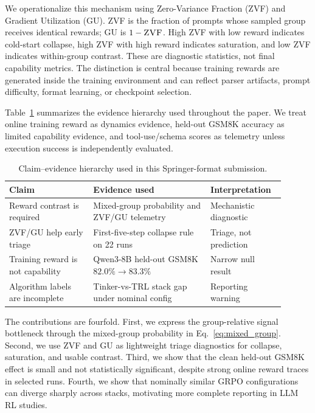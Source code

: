 \documentclass[runningheads,a4paper]{llncs}
\newcommand{\zvf}{\textsc{ZVF}}
\newcommand{\gu}{\textsc{GU}}
\begin{document}
We operationalize this mechanism using Zero-Variance Fraction (\zvf) and
Gradient Utilization (\gu). \zvf{} is the fraction of prompts whose sampled
group receives identical rewards; \gu{} is $1-\zvf$. High \zvf{} with low reward
indicates cold-start collapse, high \zvf{} with high reward indicates
saturation, and low \zvf{} indicates within-group contrast. These are diagnostic
statistics, not final capability metrics. The distinction is central because
training rewards are generated inside the training environment and can reflect
parser artifacts, prompt difficulty, format learning, or checkpoint selection.

Table~\ref{tab:claim_evidence} summarizes the evidence hierarchy used
throughout the paper. We treat online training reward as dynamics evidence,
held-out GSM8K accuracy as limited capability evidence, and tool-use/schema
scores as telemetry unless execution success is independently evaluated.

\begin{table}[t]
\centering
\caption{Claim--evidence hierarchy used in this Springer-format submission.}
\label{tab:claim_evidence}
\small
\begin{tabular}{p{0.29\linewidth}p{0.39\linewidth}p{0.22\linewidth}}
\toprule
\textbf{Claim} & \textbf{Evidence used} & \textbf{Interpretation} \\
\midrule
Reward contrast is required & Mixed-group probability and ZVF/GU telemetry & Mechanistic diagnostic \\
ZVF/GU help early triage & First-five-step collapse rule on 22 runs & Triage, not prediction \\
Training reward is not capability & Qwen3-8B held-out GSM8K $82.0\%\to83.3\%$ & Narrow null result \\
Algorithm labels are incomplete & Tinker-vs-TRL stack gap under nominal config & Reporting warning \\
\bottomrule
\end{tabular}
\end{table}

The contributions are fourfold. First, we express the group-relative signal
bottleneck through the mixed-group probability in Eq.~\ref{eq:mixed_group}.
Second, we use \zvf{} and \gu{} as lightweight triage diagnostics for collapse,
saturation, and usable contrast. Third, we show that the clean held-out GSM8K
effect is small and not statistically significant, despite strong online reward
traces in selected runs. Fourth, we show that nominally similar GRPO
configurations can diverge sharply across stacks, motivating more complete
reporting in LLM RL studies.
\end{document}
